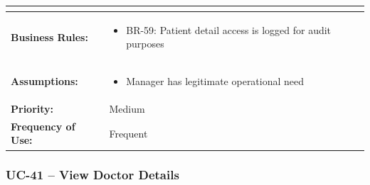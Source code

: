 \documentclass[12pt,a4paper]{article}
\begin{document}
\begin{longtable}{|p{4.5cm}|p{10.5cm}|}
\begin{itemize}
\end{itemize} \\
\hline
\textbf{Business Rules:} &
\begin{itemize}
  \item BR-59: Patient detail access is logged for audit purposes
\end{itemize} \\
\hline
\textbf{Assumptions:} &
\begin{itemize}
  \item Manager has legitimate operational need
\end{itemize} \\
\hline
\textbf{Priority:} & Medium \\
\hline
\textbf{Frequency of Use:} & Frequent \\
\hline
\end{longtable}

\subsubsection{UC-41 – View Doctor Details}
\end{document}
